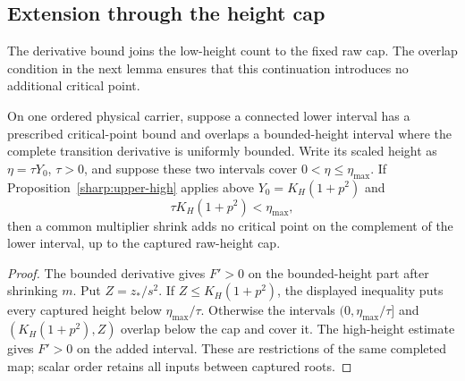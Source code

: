 \subsection{Extension through the height cap}

The derivative bound joins the low-height count to the fixed raw cap.
The overlap condition in the next lemma ensures that this continuation
introduces no additional critical point.

\begin{lemma}
\label{sharp:upper-height-splice}
On one ordered physical carrier, suppose a connected lower interval
has a prescribed critical-point bound and overlaps a bounded-height
interval where the complete transition derivative is uniformly bounded.
Write its scaled height as \(\eta=\tau Y_0\), \(\tau>0\), and
suppose these two intervals cover \(0<\eta\le\eta_{\max}\).
If Proposition~\ref{sharp:upper-high} applies above
\(Y_0=K_H(1+p^2)\) and
\begin{equation}
 \tau K_H(1+p^2)<\eta_{\max},
 \label{sharp:upper-height-splice-condition}
\end{equation}
then a common multiplier shrink adds no critical point on the
complement of the lower interval, up to the captured raw-height cap.
\end{lemma}
\begin{proof}
The bounded derivative gives \(F'>0\) on the bounded-height part
after shrinking \(m\). Put \(Z=z_*/s^2\). If
\(Z\le K_H(1+p^2)\), the displayed inequality puts every captured
height below \(\eta_{\max}/\tau\). Otherwise the intervals
\((0,\eta_{\max}/\tau]\) and \((K_H(1+p^2),Z)\) overlap
below the cap and cover it. The high-height estimate gives \(F'>0\)
on the added interval. These are restrictions of the same completed
map; scalar order retains all inputs between captured roots.
\end{proof}
